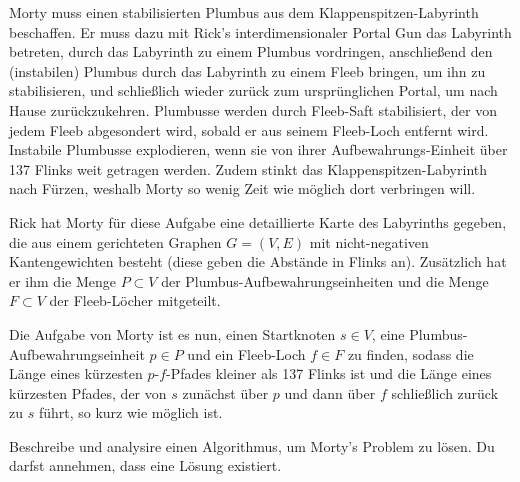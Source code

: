 \documentclass{uebung_cs}
\begin{document}
\begin{aufgabe}
    Morty muss einen stabilisierten Plumbus aus dem Klappenspitzen-Labyrinth beschaffen.
    Er muss dazu mit Rick's interdimensionaler Portal Gun das Labyrinth betreten, durch das Labyrinth zu einem Plumbus vordringen, anschließend den (instabilen) Plumbus durch das Labyrinth zu einem Fleeb bringen, um ihn zu stabilisieren, und schließlich wieder zurück zum ursprünglichen Portal, um nach Hause zurückzukehren.
    Plumbusse werden durch Fleeb-Saft stabilisiert, der von jedem Fleeb abgesondert wird, sobald er aus seinem Fleeb-Loch entfernt wird.
    Instabile Plumbusse explodieren, wenn sie von ihrer Aufbewahrungs-Einheit über 137 Flinks weit getragen werden.
    Zudem stinkt das Klappenspitzen-Labyrinth nach Fürzen, weshalb Morty so wenig Zeit wie möglich dort verbringen will.

    Rick hat Morty für diese Aufgabe eine detaillierte Karte des Labyrinths gegeben, die aus einem gerichteten Graphen $G = (V,E)$ mit nicht-negativen Kantengewichten besteht (diese geben die Abstände in Flinks an).
    Zusätzlich hat er ihm die Menge $P \subset V$ der Plumbus-Aufbewahrungseinheiten und die Menge $F \subset V$ der Fleeb-Löcher mitgeteilt.
    
    Die Aufgabe von Morty ist es nun, einen Startknoten $s \in V$, eine Plumbus-Aufbewahrungseinheit $p \in P$ und ein Fleeb-Loch $f \in F$ zu finden, sodass die Länge eines kürzesten $p$-$f$-Pfades kleiner als 137 Flinks ist und die Länge eines kürzesten Pfades, der von $s$ zunächst über $p$ und dann über $f$ schließlich zurück zu $s$ führt, so kurz wie möglich ist.

    Beschreibe und analysire einen Algorithmus, um Morty's Problem zu lösen.
    Du darfst annehmen, dass eine Lösung existiert.
\end{aufgabe}
\end{document}
